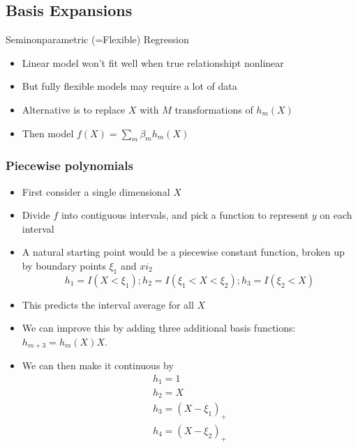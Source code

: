 \subsection{Basis Expansions}

\begin{frame}{Seminonparametric (=Flexible) Regression}
  \begin{itemize}
    \item Linear model won't fit well when true relationshipt nonlinear
    \item But fully flexible models may require a lot of data 
    \item Alternative is to replace $X$ with $M$ transformations of $h_m(X)$
    \item Then model $f(X) = \sum_m \beta_m h_m(X)$
  \end{itemize}
\end{frame}

\begin{frame}
  \frametitle{Piecewise polynomials}
  \begin{itemize}
    \item First consider a single dimensional $X$
    \item Divide $f$ into contiguous intervals, and pick a function to represent $y$ on each interval 
    \item A natural starting point would be a piecewise constant function, broken up by boundary points $\xi_1$ and $xi_2$
    $$ h_1 = I(X < \xi_1) ; h_2 = I(\xi_1 < X < \xi_2); h_3 = I(\xi_2 < X) $$ 
    \item This predicts the interval average for all $X$ 
    \item We can improve this by adding three additional basis functions: $h_{m+3} = h_m(X)X$. 
    \item We can then make it continuous by 
    \begin{eqnarray*}
      h_1 = 1 \\
      h_2 = X \\
      h_3 = (X- \xi_1)_+ \\
      h_4 = (X - \xi_2)_+ 
    \end{eqnarray*} 
      
  \end{itemize}
  
\end{frame}


